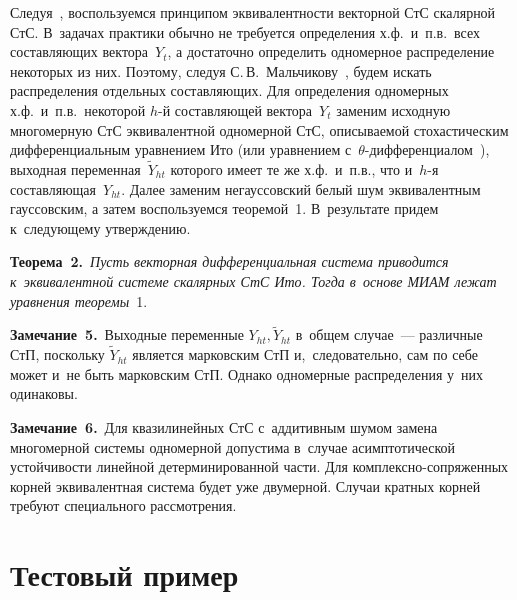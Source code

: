 \begin{multicols}{2}
Следуя~\cite{2-s, 3-s}, воспользуемся принципом эквивалентности векторной СтС 
скалярной СтС. В~задачах практики обычно не требуется определения х.ф.\ и~п.в.\
 всех составляющих вектора~$Y_t$, а достаточно определить одномерное распределение 
 некоторых из них. Поэтому, следуя С.\,В.~Мальчикову~\cite{2-s, 3-s}, 
  будем искать распределения отдельных составляющих. Для определения одномерных х.ф.\
   и~п.в.\ некоторой $h$-й составляющей вектора~$Y_t$ заменим 
   исходную многомерную СтС эквивалентной одномерной СтС, описываемой стохастическим 
   дифференциальным уравнением Ито (или уравнением с~$\theta$-дифференциалом~\cite{1-s}), 
   выходная переменная~$\tilde Y_{ht}$  которого имеет те же х.ф.\ и~п.в., 
   что и~$h$-я составляющая~$Y_{ht}$. Далее заменим негауссовский белый шум 
   эквивалентным гауссовским, а затем воспользуемся теоремой~1. 
   В~результате придем к~следующему утверждению.
   
   \smallskip
   
   \noindent
   \textbf{Теорема~2.}\
\textit{Пусть векторная дифференциальная сис\-те\-ма приводится к~эквивалентной 
системе скалярных СтС Ито. Тогда в~основе МИАМ лежат уравнения тео\-ре\-мы}~1.

\smallskip

\noindent
\textbf{Замечание~5.}\
Выходные переменные  $Y_{ht}, \tilde Y_{ht}$ в~общем случае~--- 
различные СтП, поскольку $ \tilde Y_{ht}$ является марковским СтП и,~следовательно, 
сам по себе может и~не быть марковским СтП. Однако одномерные распределения 
у~них одинаковы.

\smallskip

\noindent
\textbf{Замечание~6.}\
Для квазилинейных СтС с~аддитивным шумом замена многомерной сис\-те\-мы одномерной 
допустима в~случае асимптотической устой\-чи\-вости линейной детерминированной части. 
Для ком\-плекс\-но-со\-пря\-жен\-ных корней эквивалентная сис\-те\-ма будет уже двумерной. 
Случаи кратных корней требуют специального рассмотрения.

\section{Тестовый пример}



\end{multicols}
